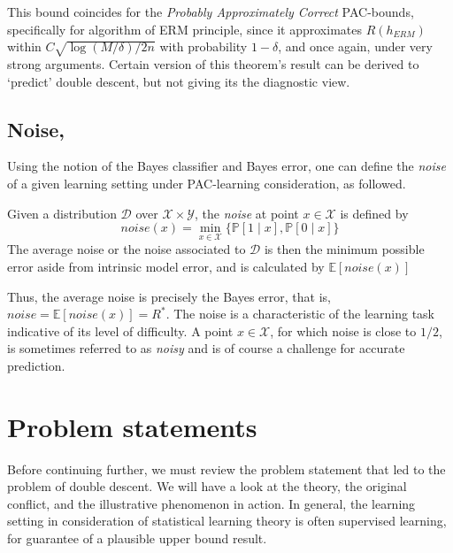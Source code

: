 \documentclass[
  journal=largetwo,
  year=2025,
  volume=37,
]{cup-journal}
\begin{document}
This bound coincides for the \textit{Probably Approximately Correct} PAC-bounds, specifically for algorithm of ERM principle, since it approximates $R(h_{ERM})$ within $C\sqrt{\log{(M/\delta)}/2n}$ with probability $1-\delta$, and once again, under very strong arguments. Certain version of this theorem's result can be derived to `predict' double descent, but not giving its the diagnostic view. 
\subsection{Noise, \cite{10.5555/2371238}}

Using the notion of the Bayes classifier and Bayes error, one can define the \textit{noise}  of a given learning setting under PAC-learning consideration, as followed. 
\begin{definition}[Noise]
    Given a distribution $\mathcal{D}$ over $\mathcal{X}\times \mathcal{Y}$, the \textit{noise} at point $x\in \mathcal{X}$ is defined by \begin{equation*}
        noise(x) = \min_{x\in \mathcal{X}} \{\mathbb{P}[1\mid x], \mathbb{P}[0\mid x]\}
    \end{equation*}
    The average noise or the noise associated to $\mathcal{D}$ is then the minimum possible error aside from intrinsic model error, and is calculated by $\mathbb{E}[noise(x)]$
\end{definition}
Thus, the average noise is precisely the Bayes error, that is, $noise = \mathbb{E}[noise(x)]=R^{*}$. The noise is a characteristic of the learning task indicative of its level of difficulty. A point $x\in \mathcal{X}$, for which noise is close to $1/2$, is sometimes referred to as \textit{noisy} and is of course a challenge for accurate prediction. 




\section{Problem statements}

Before continuing further, we must review the problem statement that led to the problem of double descent. We will have a look at the theory, the original conflict, and the illustrative phenomenon in action. In general, the learning setting in consideration of statistical learning theory is often supervised learning, for guarantee of a plausible upper bound result. 
\end{document}
